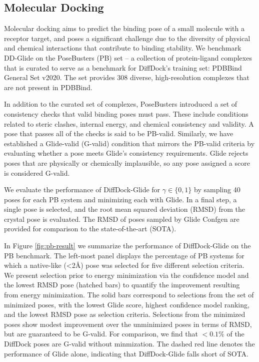 \documentclass[%
 aip,
 amsmath,amssymb,
 reprint,%
]{revtex4-1}
\begin{document}
\subsection{Molecular Docking}
\label{sec:molecular-docking}



Molecular docking aims to predict the binding pose of a small molecule with a receptor target, and poses a significant challenge due to the diversity of physical and chemical interactions that contribute to binding stability. We benchmark DD-Glide on the PoseBusters\cite{buttenschoen2024posebusters} (PB) set -- a collection of protein-ligand complexes that is curated to serve as a benchmark for DiffDock's training set: PDBBind General Set v2020. The set provides 308 diverse, high-resolution complexes that are not present in PDBBind.

In addition to the curated set of complexes, PoseBusters introduced a set of consistency checks that valid binding poses must pass. These include conditions related to steric clashes, internal energy, and chemical consistency and validity. A pose that passes all of the checks is said to be PB-valid. Similarly, we have established a Glide-valid (G-valid) condition that mirrors the PB-valid criteria by evaluating whether a pose meets Glide's consistency requirements. Glide rejects poses that are physically or chemically implausible, so any pose assigned a score is considered G-valid.

We evaluate the performance of DiffDock-Glide for $\gamma\in \{0,1\}$ by sampling 40 poses for each PB system and minimizing each with Glide. In a final step, a single pose is selected, and the root mean squared deviation (RMSD) from the crystal pose is evaluated. The RMSD of poses sampled by Glide Confgen are provided for comparison to the state-of-the-art (SOTA).

In Figure \ref{fig:pb-result} we summarize the performance of DiffDock-Glide on the PB benchmark. The left-most panel displays the percentage of PB systems for which a native-like (<2{\AA}) pose was selected for five different selection criteria. We present selection prior to energy minimization via the confidence model and the lowest RMSD pose (hatched bars) to quantify the improvement resulting from energy minimization. The solid bars correspond to selections from the set of minimized poses, with the lowest Glide score, highest confidence model ranking, and the lowest RMSD pose as selection criteria. Selections from the minimized poses show modest improvement over the unminimized poses in terms of RMSD, but are guaranteed to be G-valid. For comparison, we find that $<0.1\%$ of the DiffDock poses are G-valid without minmization. The dashed red line denotes the performance of Glide alone, indicating that DiffDock-Glide falls short of SOTA.
\end{document}
